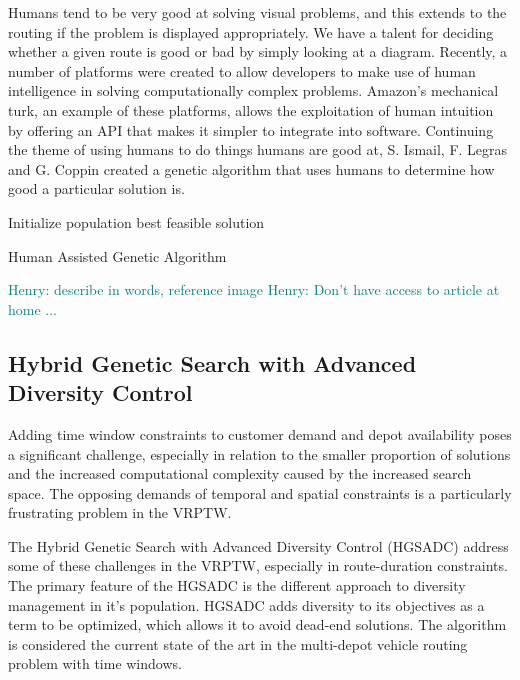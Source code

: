 \documentclass{sig-alternate}
\newcommand{\allcomments}[1]{{#1}}
\newcommand{\hfcomment}[1]{\textcolor{Teal}{\allcomments{Henry: {#1}}}}
\begin{document}
Humans tend to be very good at solving visual problems, and this extends to the routing if the problem is displayed appropriately. We have a talent for deciding whether a given route is good or bad by simply looking at a diagram. Recently, a number of platforms were created to allow developers to make use of human intelligence in solving computationally complex problems. Amazon's mechanical turk, an example of these platforms, allows the exploitation of human intuition by offering an API that makes it simpler to integrate into software. Continuing the theme of using humans to do things humans are good at, S. Ismail, F. Legras and G. Coppin\cite{Ismail:2012} created a genetic algorithm that uses humans to determine how good a particular solution is. 


\begin{algorithm}
Initialize population\;
\Return best feasible solution\;
\caption{Human Assisted Genetic Algorithm\label{HUMGA}}
\end{algorithm}
\hfcomment{describe in words, reference image}
\hfcomment{Don't have access to article at home ...}
\subsection{Hybrid Genetic Search with Advanced Diversity Control}
Adding time window constraints to customer demand and depot availability poses a significant challenge, especially in relation to the smaller proportion of solutions and the increased computational complexity caused by the increased search space. The opposing demands of temporal and spatial constraints is a particularly frustrating problem in the VRPTW.

The Hybrid Genetic Search with Advanced Diversity Control (HGSADC) address some of these challenges in the VRPTW, especially in route-duration constraints. The primary feature of the HGSADC is the different approach to diversity management in it's population. HGSADC adds diversity to its objectives as a term to be optimized, which allows it to avoid dead-end solutions. The algorithm is considered the current state of the art in the multi-depot vehicle routing problem with time windows\cite{Vidal:2013}.
\end{document}
